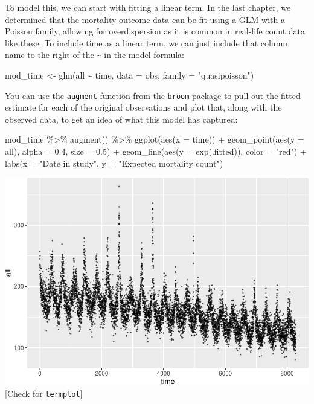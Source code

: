 \documentclass[
]{book}
\newenvironment{Shaded}{\begin{snugshade}}{\end{snugshade}}
\newcommand{\AttributeTok}[1]{\textcolor[rgb]{0.77,0.63,0.00}{#1}}
\newcommand{\FloatTok}[1]{\textcolor[rgb]{0.00,0.00,0.81}{#1}}
\newcommand{\FunctionTok}[1]{\textcolor[rgb]{0.00,0.00,0.00}{#1}}
\newcommand{\NormalTok}[1]{#1}
\newcommand{\OtherTok}[1]{\textcolor[rgb]{0.56,0.35,0.01}{#1}}
\newcommand{\SpecialCharTok}[1]{\textcolor[rgb]{0.00,0.00,0.00}{#1}}
\newcommand{\StringTok}[1]{\textcolor[rgb]{0.31,0.60,0.02}{#1}}
\begin{document}
To model this, we can start with fitting a linear term. In the last chapter,
we determined that the mortality outcome data can be fit using a GLM with a
Poisson family, allowing for overdispersion as it is common in real-life
count data like these. To include time as a linear term, we can just include
that column name to the right of the \texttt{\textasciitilde{}} in the model formula:

\begin{Shaded}
\begin{Highlighting}[]
\NormalTok{mod\_time }\OtherTok{\textless{}{-}} \FunctionTok{glm}\NormalTok{(all }\SpecialCharTok{\textasciitilde{}}\NormalTok{ time, }
                \AttributeTok{data =}\NormalTok{ obs, }\AttributeTok{family =} \StringTok{"quasipoisson"}\NormalTok{)}
\end{Highlighting}
\end{Shaded}

You can use the \texttt{augment} function from the \texttt{broom} package to pull out the
fitted estimate for each of the original observations and plot that, along
with the observed data, to get an idea of what this model has captured:

\begin{Shaded}
\begin{Highlighting}[]
\NormalTok{mod\_time }\SpecialCharTok{\%\textgreater{}\%} 
  \FunctionTok{augment}\NormalTok{() }\SpecialCharTok{\%\textgreater{}\%} 
  \FunctionTok{ggplot}\NormalTok{(}\FunctionTok{aes}\NormalTok{(}\AttributeTok{x =}\NormalTok{ time)) }\SpecialCharTok{+} 
  \FunctionTok{geom\_point}\NormalTok{(}\FunctionTok{aes}\NormalTok{(}\AttributeTok{y =}\NormalTok{ all), }\AttributeTok{alpha =} \FloatTok{0.4}\NormalTok{, }\AttributeTok{size =} \FloatTok{0.5}\NormalTok{) }\SpecialCharTok{+} 
  \FunctionTok{geom\_line}\NormalTok{(}\FunctionTok{aes}\NormalTok{(}\AttributeTok{y =} \FunctionTok{exp}\NormalTok{(.fitted)), }\AttributeTok{color =} \StringTok{"red"}\NormalTok{) }\SpecialCharTok{+} 
  \FunctionTok{labs}\NormalTok{(}\AttributeTok{x =} \StringTok{"Date in study"}\NormalTok{, }\AttributeTok{y =} \StringTok{"Expected mortality count"}\NormalTok{) }
\end{Highlighting}
\end{Shaded}

\includegraphics{adv_epi_analysis_files/figure-latex/unnamed-chunk-47-1.pdf}
{[}Check for \texttt{termplot}{]}
\end{document}
